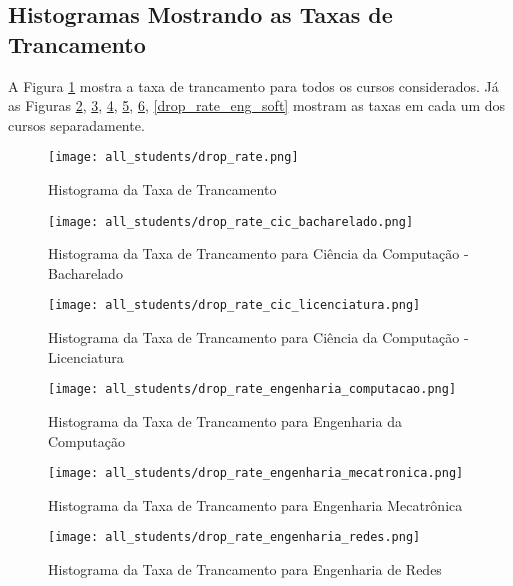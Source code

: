 \clearpage

\subsection{Histogramas Mostrando as Taxas de Trancamento}
A Figura \ref{drop_rate_all} mostra a taxa de trancamento para todos os cursos
considerados. 
Já as Figuras \ref{drop_rate_cic_b}, \ref{drop_rate_cic_lic},
\ref{drop_rate_eng_comp}, \ref{drop_rate_eng_mectr}, \ref{drop_rate_eng_redes},
\ref{drop_rate_eng_soft} mostram as taxas em cada um dos cursos separadamente. 

\begin{figure}[!ht]
    \caption{Histograma da Taxa de Trancamento}
    \centering
    \texttt{[image: all\_students/drop\_rate.png]}
    \label{drop_rate_all}
\end{figure}

\begin{figure}[!ht]
    \caption{Histograma da Taxa de Trancamento para Ciência da Computação - Bacharelado}
    \centering
    \texttt{[image: all\_students/drop\_rate\_cic\_bacharelado.png]}
    \label{drop_rate_cic_b}
\end{figure}

\begin{figure}[!ht]
    \caption{Histograma da Taxa de Trancamento para Ciência da Computação -
    Licenciatura}
    \centering
    \texttt{[image: all\_students/drop\_rate\_cic\_licenciatura.png]}
    \label{drop_rate_cic_lic}
\end{figure}

\begin{figure}[!ht]
    \caption{Histograma da Taxa de Trancamento para Engenharia da Computação}
    \centering
    \texttt{[image: all\_students/drop\_rate\_engenharia\_computacao.png]}
    \label{drop_rate_eng_comp}
\end{figure}

\begin{figure}[!ht]
    \caption{Histograma da Taxa de Trancamento para Engenharia Mecatrônica}
    \centering
    \texttt{[image: all\_students/drop\_rate\_engenharia\_mecatronica.png]}
    \label{drop_rate_eng_mectr}
\end{figure}

\begin{figure}[!ht]
    \caption{Histograma da Taxa de Trancamento para Engenharia de Redes}
    \centering
    \texttt{[image: all\_students/drop\_rate\_engenharia\_redes.png]}
    \label{drop_rate_eng_redes}
\end{figure}

